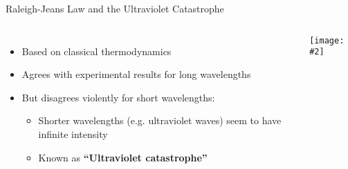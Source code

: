 \documentclass[12pt,compress,aspectratio=169]{beamer}
\newcommand{\pic}[2]{\texttt{[image: \#2]}}
\newcommand{\eq}[2]{\vspace{#1}{\Large\begin{displaymath}#2\end{displaymath}}}
\begin{document}
%
%
%



\begin{frame}{Raleigh-Jeans Law and the Ultraviolet Catastrophe}
  \begin{columns}
    \begin{itemize}
    \item Based on classical thermodynamics
      
      \eq{-.35in}{
        P(\lambda,T)=8\pi kT\lambda^{-4}
      }

      \vspace{-.2in}{\footnotesize $T$=temperature, $\lambda$=wavelength,
        $k$=Boltzmann's constant}
    \item Agrees with experimental results for long wavelengths
    \item But disagrees violently for short wavelengths:
      \begin{itemize}
      \item Shorter wavelengths (e.g. ultraviolet waves) seem to have infinite
        intensity
      \item Known as \textbf{``Ultraviolet catastrophe''}
      \end{itemize}
    \end{itemize}

    \pic{1}{1280px-Black_body.png}
  \end{columns}
\end{frame}
\end{document}
